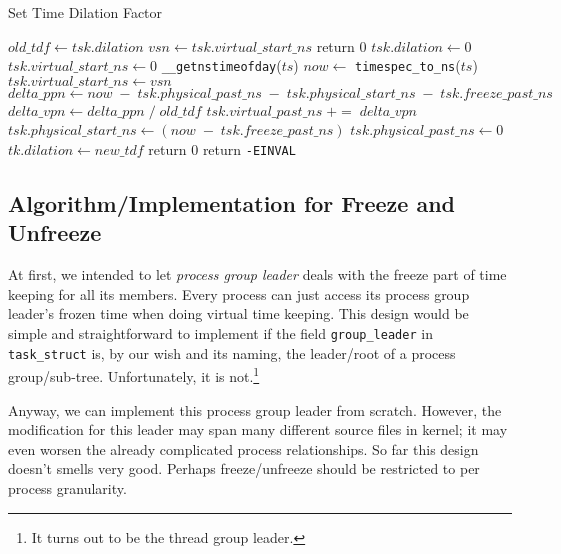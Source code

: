 \documentclass{acm_proc_article-sp}
\begin{document}
\begin{algorithm*}[t]
\caption{Set Time Dilation Factor}
\label{Alg-SetTDF}
\begin{algorithmic}[1]
\State $old\_tdf \gets tsk.dilation$
\State $vsn \gets tsk.virtual\_start\_ns$
	\State return 0
	\State {}
	\State {}
	\State $tsk.dilation \gets 0$
	\State $tsk.virtual\_start\_ns \gets 0$
	\State \texttt{\_\_getnstimeofday}($ts$)
	\State $now \gets$ \texttt{timespec\_to\_ns}($ts$)
	\State $tsk.virtual\_start\_ns \gets vsn$
	\State $delta\_ppn \gets now \; - \; tsk.physical\_past\_ns \; - \; tsk. physical\_start\_ns \; - \; tsk.freeze\_past\_ns$
	\State $delta\_vpn \gets delta\_ppn \; / \; old\_tdf$
	\State $tsk.virtual\_past\_ns \; += \; delta\_vpn$
	\State $tsk.physical\_start\_ns \gets (now \; - \; tsk.freeze\_past\_ns)$
	\State $tsk.physical\_past\_ns \gets 0$
	\State $tk.dilation \gets new\_tdf$
	\State return 0
\Else
	\State return \texttt{-EINVAL}
\EndIf
{}
	\State {}
\EndFor
\EndFunction
\end{algorithmic}
\end{algorithm*}

\subsection{Algorithm/Implementation for Freeze and Unfreeze}
At first, we intended to let \textit{process group leader} deals with the freeze part of time keeping for all its members. Every process can just access its process group leader's frozen time when doing virtual time keeping. 
This design would be simple and straightforward to implement if the field \texttt{group\_leader} in \texttt{task\_struct} is, by our wish and its naming, the leader/root of a process group/sub-tree. Unfortunately, it is not.\footnote{It turns out to be the thread group leader.}

Anyway, we can implement this process group leader from scratch. However, the modification for this leader may span many different source files in kernel; it may even worsen the already complicated process relationships. So far this design doesn't smells very good. Perhaps freeze/unfreeze should be restricted to per process granularity.
\end{document}
